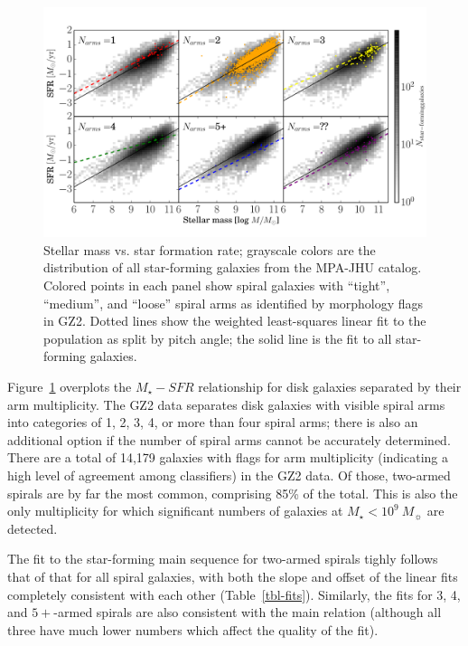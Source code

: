 \documentclass{emulateapj}
\begin{document}
\begin{figure}
\includegraphics[angle=0,width=7.0in]{figures/ms_arms_number.pdf}
\caption{Stellar mass vs. star formation rate; grayscale colors are the distribution of all star-forming galaxies from the MPA-JHU catalog. Colored points in each panel show spiral galaxies with ``tight'', ``medium'', and ``loose'' spiral arms as identified by morphology flags in GZ2. Dotted lines show the weighted least-squares linear fit to the population as split by pitch angle; the solid line is the fit to all star-forming galaxies. 
\label{fig-number}}
\end{figure}

Figure~\ref{fig-number} overplots the $M_\star-SFR$ relationship for disk galaxies separated by their arm multiplicity. The GZ2 data separates disk galaxies with visible spiral arms into categories of 1, 2, 3, 4, or more than four spiral arms; there is also an additional option if the number of spiral arms cannot be accurately determined. There are a total of 14,179 galaxies with flags for arm multiplicity (indicating a high level of agreement among classifiers) in the GZ2 data. Of those, two-armed spirals are by far the most common, comprising 85\% of the total. This is also the only multiplicity for which significant numbers of galaxies at $M_\star<10^9~M_\sun$ are detected. 

The fit to the star-forming main sequence for two-armed spirals tighly follows that of that for all spiral galaxies, with both the slope and offset of the linear fits completely consistent with each other (Table~\ref{tbl-fits}). Similarly, the fits for 3, 4, and $5+$-armed spirals are also consistent with the main relation (although all three have much lower numbers which affect the quality of the fit). 
\end{document}
